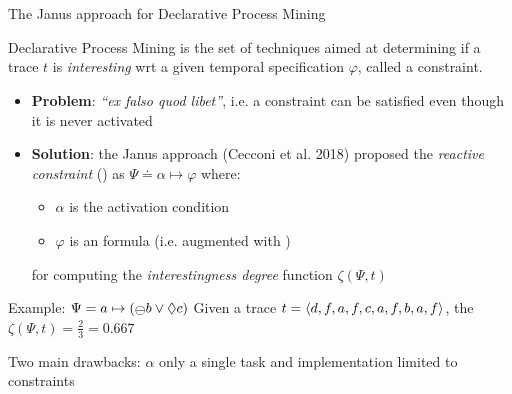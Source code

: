 \documentclass[10pt]{beamer}
\begin{document}
\section{\janus}
\fontsize{10}{10}\selectfont
\begin{frame}{The Janus approach for Declarative Process Mining}
\begin{block}{}
Declarative Process Mining is the set of techniques aimed at determining if a trace $t$ is \emph{interesting} wrt a given temporal specification $\varphi$, called a constraint. 
\end{block}
\begin{itemize}
\item \textbf{Problem}: \emph{``ex falso quod libet''}, i.e. a constraint can be satisfied even though it is never activated
\item \textbf{Solution}: the Janus approach (Cecconi et al. 2018) proposed the \textit{reactive constraint} (\rcon\xspace) as $\Psi \doteq \alpha \mapsto \varphi$ where:
\begin{itemize}
\item $\alpha$ is the activation condition
\item $\varphi$ is an \LTLp formula (i.e. \LTLf augmented with \PLTL)
\end{itemize}
for computing the \emph{interestingness degree} function $\zeta(\Psi, t)$
\end{itemize}

\begin{exampleblock}{Example: $\Psi = a \mapsto (\Yesterday b \lOR \Diamond c)$}
Given a trace $t = \langle d,f,a,f,c,a,f,b,a,f \rangle$, the $\zeta(\Psi, t) = \tfrac{2}{3} = 0.667$
\end{exampleblock}

\begin{alertblock}{Two main drawbacks:}
$\alpha$ only a single task and implementation limited to \declare constraints
\end{alertblock}

\end{frame}
\end{document}
